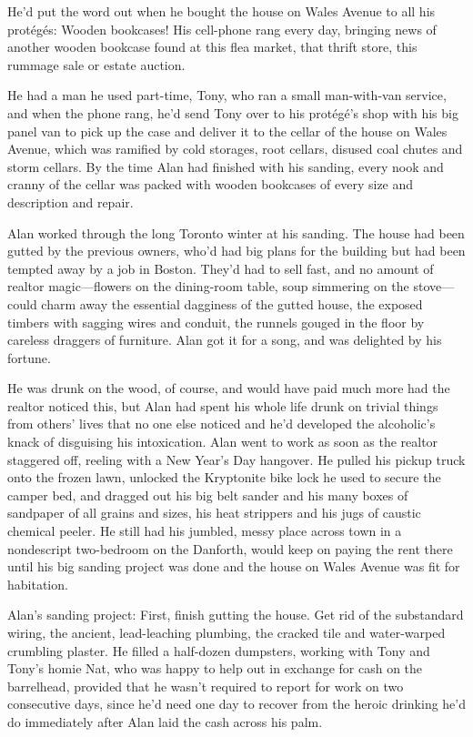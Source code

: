 \documentclass{article}
\begin{document}
He'd put the word out when he bought the house on Wales Avenue to all
his prot\'{e}g\'{e}s:  Wooden bookcases!  His cell-phone rang every day,
bringing news of another wooden bookcase found at this flea market,
that thrift store, this rummage sale or estate auction.

He had a man he used part-time, Tony, who ran a small man-with-van
service, and when the phone rang, he'd send Tony over to his
prot\'{e}g\'{e}'s shop with his big panel van to pick up the case and
deliver it to the cellar of the house on Wales Avenue, which was
ramified by cold storages, root cellars, disused coal chutes and storm
cellars.  By the time Alan had finished with his sanding, every nook
and cranny of the cellar was packed with wooden bookcases of every
size and description and repair.

Alan worked through the long Toronto winter at his sanding.  The house
had been gutted by the previous owners, who'd had big plans for the
building but had been tempted away by a job in Boston.  They'd had to
sell fast, and no amount of realtor magic---flowers on the dining-room
table, soup simmering on the stove---could charm away the essential
dagginess of the gutted house, the exposed timbers with sagging wires
and conduit, the runnels gouged in the floor by careless draggers of
furniture.  Alan got it for a song, and was delighted by his fortune.

He was drunk on the wood, of course, and would have paid much more had
the realtor noticed this, but Alan had spent his whole life drunk on
trivial things from others' lives that no one else noticed and he'd
developed the alcoholic's knack of disguising his intoxication.  Alan
went to work as soon as the realtor staggered off, reeling with a New
Year's Day hangover.  He pulled his pickup truck onto the frozen lawn,
unlocked the Kryptonite bike lock he used to secure the camper bed,
and dragged out his big belt sander and his many boxes of sandpaper of
all grains and sizes, his heat strippers and his jugs of caustic
chemical peeler.  He still had his jumbled, messy place across town in
a nondescript two-bedroom on the Danforth, would keep on paying the
rent there until his big sanding project was done and the house on
Wales Avenue was fit for habitation.

Alan's sanding project:  First, finish gutting the house.  Get rid of
the substandard wiring, the ancient, lead-leaching plumbing, the
cracked tile and water-warped crumbling plaster.  He filled a
half-dozen dumpsters, working with Tony and Tony's homie Nat, who was
happy to help out in exchange for cash on the barrelhead, provided
that he wasn't required to report for work on two consecutive days,
since he'd need one day to recover from the heroic drinking he'd do
immediately after Alan laid the cash across his palm.
\end{document}
